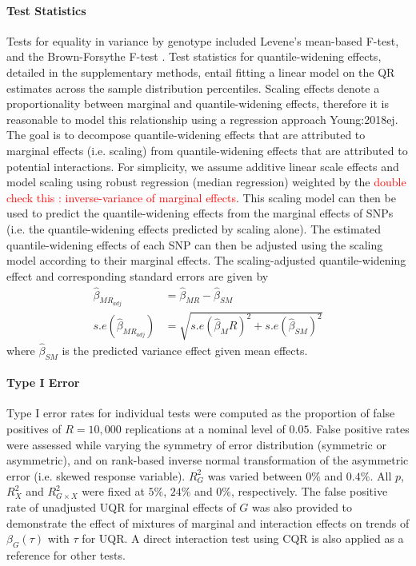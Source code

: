 \documentclass[12pt]{article}
\begin{document}
\paragraph{Test Statistics} Tests for equality in variance by genotype included Levene's mean-based F-test, and the Brown-Forsythe F-test \cite{struchalin2010variance}. Test statistics for quantile-widening effects, detailed in the supplementary methods, entail fitting a linear model on the QR estimates across the sample distribution percentiles. Scaling effects denote a proportionality between marginal and quantile-widening effects, therefore it is reasonable to model this relationship using a regression approach {Young:2018ej}. The goal is to decompose quantile-widening effects that are attributed to marginal effects (i.e. scaling) from quantile-widening effects that are attributed to potential interactions. For simplicity, we assume additive linear scale effects and model scaling using robust regression (median regression) weighted by the \textcolor{red}{double check this : inverse-variance of marginal effects}. This scaling model can then be used to predict the quantile-widening effects from the marginal effects of SNPs (i.e. the quantile-widening effects predicted by scaling alone). The estimated quantile-widening effects of each SNP can then be adjusted using the scaling model according to their marginal effects. The scaling-adjusted quantile-widening effect and corresponding standard errors are given by
\begin{equation}
\begin{split}
\hat{\beta}_{MR_{adj}}&=\hat{\beta}_{MR} - \hat{\beta}_{SM} \\
s.e(\hat{\beta}_{MR_{adj}}) &= \sqrt{s.e(\hat{\beta}_MR)^2 + s.e(\hat{\beta}_{SM})^2}
\end{split}
\end{equation}
where $\hat{\beta}_{SM}$ is the predicted variance effect given mean effects.

\paragraph{Type I Error}Type I error rates for individual tests were computed as the proportion of false positives of $R=10,000$ replications at a nominal level of $0.05$. False positive rates were assessed while varying the symmetry of error distribution (symmetric or asymmetric), and on rank-based inverse normal transformation of the asymmetric error (i.e. skewed response variable). $R^{2}_{G}$ was varied between $0\%$ and $0.4\%$. All $p$, $R^{2}_{X}$ and $R^{2}_{G \times X}$ were fixed at $5\%$, $24\%$ and $0\%$, respectively. The false positive rate of unadjusted UQR for marginal effects of $G$ was also provided to demonstrate the effect of mixtures of marginal and interaction effects on trends of $\beta_G (\tau)$ with $\tau$ for UQR. A direct interaction test using CQR is also applied as a reference for other tests. 
\end{document}
